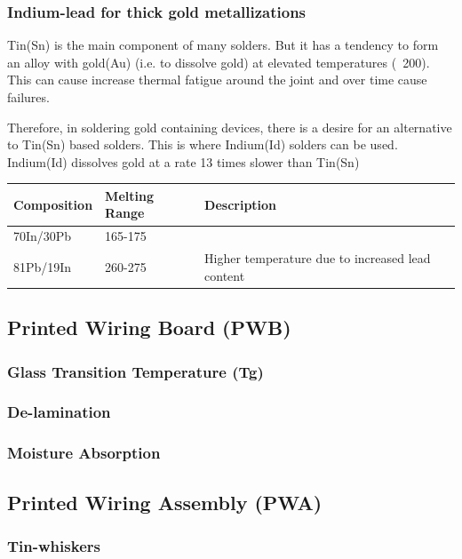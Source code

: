 \documentclass{article}
\begin{document}
		\subsubsection{Indium-lead for thick gold metallizations}
		Tin(Sn) is the main component of many solders.
		But it has a tendency to form an alloy with gold(Au) (i.e. to dissolve gold) at elevated temperatures (~200\degree).
		This can cause increase thermal fatigue around the joint and over time cause failures.
		
		Therefore, in soldering gold containing devices, there is a desire for an alternative to Tin(Sn) based solders.
		This is where Indium(Id) solders can be used. Indium(Id) dissolves gold at a rate 13 times slower than Tin(Sn)
		
		\begin{center}
 			\begin{tabular}{| m{10em} | m{5em}| m{17em} |} 
 			\hline
 			\textbf{Composition} & \textbf{Melting Range} & \textbf{Description} \\ [0.5ex] 
 			\hline
 			 70In/30Pb & 165-175\degree &  \\ 
 			\hline
 			81Pb/19In & 260-275\degree & Higher temperature due to increased lead content \\ 
 			\hline
			\end{tabular}
		\end{center}	
	
	\subsection{Printed Wiring Board (PWB)}
		\subsubsection{Glass Transition Temperature (Tg)}
		\subsubsection{De-lamination}
		\subsubsection{Moisture Absorption}

	\subsection{Printed Wiring Assembly (PWA)}
		\subsubsection{Tin-whiskers}
\end{document}
